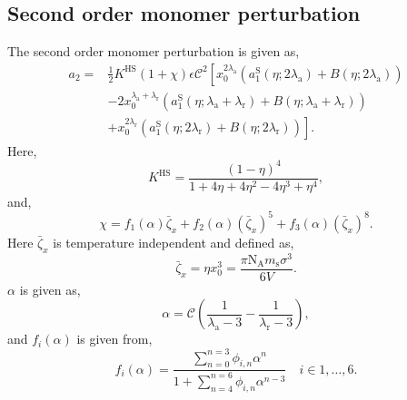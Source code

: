 \documentclass[english]{../thermomemo/thermomemo}
\newcommand*{\lb}{\left(}
\newcommand*{\rb}{\right)}
\newcommand{\hs}{\text{HS}\xspace}
\newcommand{\seg}{\ensuremath{\text{s}}\xspace}
\newcommand{\lama}{\ensuremath{{\lambda_{\text{a}}}}\xspace}
\newcommand{\lamr}{\ensuremath{{\lambda_{\text{r}}}}\xspace}
\newcommand{\aS}{\ensuremath{a_{1}^{\text{S}}}\xspace}
\newcommand{\zb}{\bar{\zeta}}
\newcommand{\NA}{\ensuremath{\text{N}_{\text{A}}}\xspace}
\begin{document}
\subsection{Second order monomer perturbation}
The second order monomer perturbation is given as,
\begin{align}
  \label{eq:a_2}
  a_2 =& \frac{1}{2} K^\hs \lb 1 + \chi \rb \epsilon \mathcal{C}^2 \left[
         x_0^{2\lama}\lb \aS \lb \eta; 2\lama \rb + B \lb \eta; 2\lama \rb \rb \right.\\
       &-2x_0^{\lama + \lamr}\lb \aS \lb \eta; \lama + \lamr \rb + B \lb \eta; \lama + \lamr \rb\rb \\
  & \left. + x_0^{2\lamr}\lb \aS \lb \eta; 2\lamr \rb + B \lb \eta; 2\lamr \rb\rb
  \right].
\end{align}
Here,
\begin{equation}
  \label{eq:K_HS}
  K^\hs = \frac{\lb 1-\eta \rb^4}{1 + 4 \eta + 4 \eta^2 - 4 \eta^3 +  \eta^4},
\end{equation}
and,
\begin{equation}
  \label{eq:chi}
  \chi = f_1\lb \alpha \rb \zb_x + f_2\lb \alpha \rb \lb \zb_x\rb^5 + f_3 \lb \alpha \rb\lb \zb_x\rb^8.
\end{equation}
Here $\zb_x$ is temperature independent and defined as,
\begin{equation}
  \label{eq:zxb}
  \zb_x =  \eta x_0^3 = \frac{\pi\NA m_\seg \sigma^3}{ 6 V}.
\end{equation}
$\alpha$ is given as,
\begin{equation}
  \label{eq:alpha}
  \alpha = \mathcal{C} \lb \frac{1}{\lama - 3} - \frac{1}{\lamr - 3} \rb,
\end{equation}
and $f_i\lb \alpha \rb$ is given from,
\begin{equation}
  \label{eq:f_alpha}
  f_i\lb \alpha \rb = \frac{\sum_{n=0}^{n=3} \phi_{i,n} \alpha^n}{1 + \sum_{n=4}^{n=6} \phi_{i,n} \alpha^{n-3}}  \quad i \in 1,\dots,6.
\end{equation}
\end{document}
